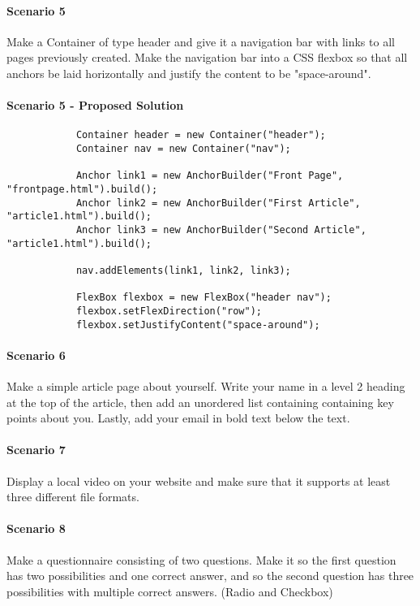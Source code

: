 \documentclass[12pt]{article}
\begin{document}
        \paragraph{Scenario 5}
        Make a Container of type header and give it a navigation bar with links to all pages previously created. Make the navigation bar into a CSS flexbox so that all anchors be laid horizontally and justify the content to be "space-around".

        \paragraph{Scenario 5 - Proposed Solution}

        \begin{lstlisting}
            Container header = new Container("header");
            Container nav = new Container("nav");

            Anchor link1 = new AnchorBuilder("Front Page", "frontpage.html").build();
            Anchor link2 = new AnchorBuilder("First Article", "article1.html").build();
            Anchor link3 = new AnchorBuilder("Second Article", "article1.html").build();

            nav.addElements(link1, link2, link3);

            FlexBox flexbox = new FlexBox("header nav");
            flexbox.setFlexDirection("row");
            flexbox.setJustifyContent("space-around");
        \end{lstlisting}

        \paragraph{Scenario 6}
        Make a simple article page about yourself. Write your name in a level 2 heading at the top of the article, then add an unordered list containing containing key points about you. Lastly, add your email in bold text below the text.

        \paragraph{Scenario 7}
        Display a local video on your website and make sure that it supports at least three different file formats.

        \paragraph{Scenario 8}
        Make a questionnaire consisting of two questions. Make it so the first question has two possibilities and one correct answer, and so the second question has three possibilities with multiple correct answers. (Radio and Checkbox)
\end{document}
